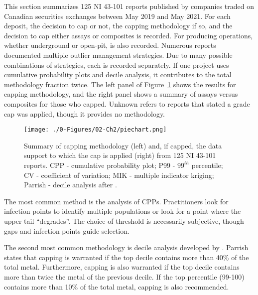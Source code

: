 This section summarizes 125 \gls{NI} 43-101 reports published by companies traded on Canadian securities exchanges between May 2019 and May 2021. For each deposit, the decision to cap or not, the capping methodology if so, and the decision to cap either assays or composites is recorded. For producing operations, whether underground or open-pit, is also recorded. Numerous reports documented multiple outlier management strategies. Due to many possible combinations of strategies, each is recorded separately. If one project uses cumulative probability plots and decile analysis, it contributes to the total methodology fraction twice. The left panel of Figure~\ref{fig:piechart} shows the results for capping methodology, and the right panel shows a summary of assays versus composites for those who capped. Unknown refers to reports that stated a grade cap was applied, though it provides no methodology.

\begin{figure}[htb!]
    \centering
    \texttt{[image: ./0-Figures/02-Ch2/piechart.png]}
    \caption{Summary of capping methodology (left) and, if capped, the data support to which the cap is applied (right) from 125 \gls{NI} 43-101 reports. CPP - cumulative probability plot; P99 - $99^{th}$ percentile; CV - coefficient of variation; MIK - multiple indicator kriging; Parrish - decile analysis after \cite{parrish1997geologist}.}
    \label{fig:piechart}
\end{figure}

The most common method is the analysis of \glspl{CPP}. Practitioners look for infection points to identify multiple populations or look for a point where the upper tail ``degrades''. The choice of threshold is necessarily subjective, though gaps and infection points guide selection.


The second most common methodology is decile analysis developed by \cite{parrish1997geologist}. Parrish states that capping is warranted if the top decile contains more than 40\% of the total metal. Furthermore, capping is also warranted if the top decile contains more than twice the metal of the previous decile. If the top percentile (99-100) contains more than 10\% of the total metal, capping is also recommended.

